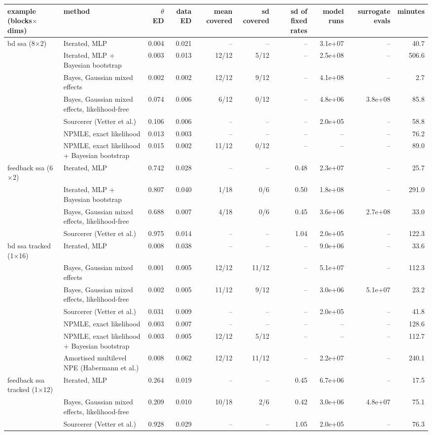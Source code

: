 \begin{tabular}{llrrrrrrrr}
\toprule
example (blocks$\times$dims) & method & $\theta$ ED & data ED & mean covered & sd covered & sd of fixed rates & model runs & surrogate evals & minutes \\
\midrule
bd ssa (8$\times$2) & Iterated, MLP & 0.004 & 0.021 & -- & -- & -- & 3.1e+07 & -- & 40.7 \\
 & Iterated, MLP + Bayesian bootstrap & 0.003 & 0.013 & 12/12 & 5/12 & -- & 2.5e+08 & -- & 506.6 \\
 & Bayes, Gaussian mixed effects & 0.002 & 0.002 & 12/12 & 9/12 & -- & 4.1e+08 & -- & 2.7 \\
 & Bayes, Gaussian mixed effects, likelihood-free & 0.074 & 0.006 & 6/12 & 0/12 & -- & 4.8e+06 & 3.8e+08 & 85.8 \\
 & Sourcerer (Vetter et al.) & 0.106 & 0.006 & -- & -- & -- & 2.0e+05 & -- & 58.8 \\
 & NPMLE, exact likelihood & 0.013 & 0.003 & -- & -- & -- & -- & -- & 76.2 \\
 & NPMLE, exact likelihood + Bayesian bootstrap & 0.015 & 0.002 & 11/12 & 0/12 & -- & -- & -- & 89.0 \\ \addlinespace
feedback ssa (6$\times$2) & Iterated, MLP & 0.742 & 0.028 & -- & -- & 0.48 & 2.3e+07 & -- & 25.7 \\
 & Iterated, MLP + Bayesian bootstrap & 0.807 & 0.040 & 1/18 & 0/6 & 0.50 & 1.8e+08 & -- & 291.0 \\
 & Bayes, Gaussian mixed effects, likelihood-free & 0.688 & 0.007 & 4/18 & 0/6 & 0.45 & 3.6e+06 & 2.7e+08 & 33.0 \\
 & Sourcerer (Vetter et al.) & 0.975 & 0.014 & -- & -- & 1.04 & 2.0e+05 & -- & 122.3 \\ \addlinespace
bd ssa tracked (1$\times$16) & Iterated, MLP & 0.008 & 0.038 & -- & -- & -- & 9.0e+06 & -- & 33.6 \\
 & Bayes, Gaussian mixed effects & 0.001 & 0.005 & 12/12 & 11/12 & -- & 5.1e+07 & -- & 112.3 \\
 & Bayes, Gaussian mixed effects, likelihood-free & 0.002 & 0.005 & 11/12 & 9/12 & -- & 3.0e+06 & 5.1e+07 & 23.2 \\
 & Sourcerer (Vetter et al.) & 0.031 & 0.009 & -- & -- & -- & 2.0e+05 & -- & 41.8 \\
 & NPMLE, exact likelihood & 0.003 & 0.007 & -- & -- & -- & -- & -- & 128.6 \\
 & NPMLE, exact likelihood + Bayesian bootstrap & 0.003 & 0.005 & 12/12 & 5/12 & -- & -- & -- & 112.7 \\
 & Amortised multilevel NPE (Habermann et al.) & 0.008 & 0.062 & 12/12 & 11/12 & -- & 2.2e+07 & -- & 240.1 \\ \addlinespace
feedback ssa tracked (1$\times$12) & Iterated, MLP & 0.264 & 0.019 & -- & -- & 0.45 & 6.7e+06 & -- & 17.5 \\
 & Bayes, Gaussian mixed effects, likelihood-free & 0.209 & 0.010 & 10/18 & 2/6 & 0.42 & 3.0e+06 & 4.8e+07 & 75.1 \\
 & Sourcerer (Vetter et al.) & 0.928 & 0.029 & -- & -- & 1.05 & 2.0e+05 & -- & 76.3 \\
\bottomrule
\end{tabular}
